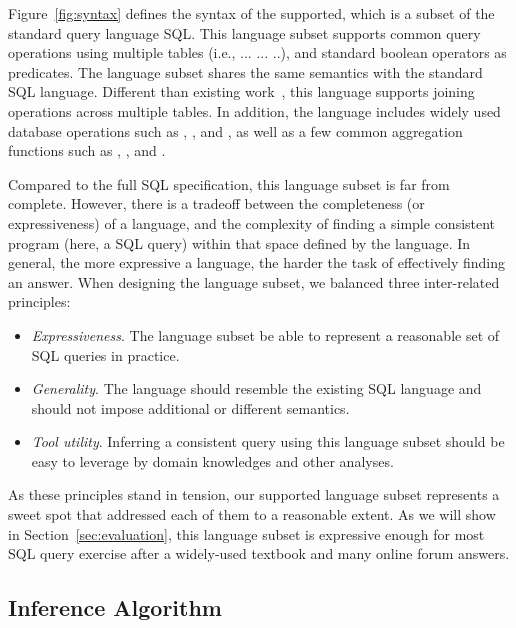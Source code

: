 Figure~\ref{fig:syntax} defines the syntax of the supported, which
is a subset of the standard query language SQL. This language subset
supports common query operations using multiple tables (i.e.,
 ... ... ..), and standard
boolean operators as predicates. The language
subset shares the same semantics with the standard SQL language.
Different than existing work~\cite{DasSarma:2010}, this language supports
joining operations across multiple tables.  In addition, the language includes
widely used database operations such as ,
, and , as
well as a few common aggregation functions such as ,
, and .

Compared to the full SQL specification, this language subset is far from complete.
However, there is a tradeoff between the completeness (or expressiveness) of a language,
and the complexity of finding a simple consistent program (here, a SQL query)
within that space defined by the language. In general, the more expressive
a language, the harder the task of effectively finding an answer. When
designing the language subset, we balanced three inter-related principles:

\begin{itemize}

\item \textit{Expressiveness}. The language subset be able
to represent a reasonable set of SQL queries in practice.

\item \textit{Generality}. The language should resemble
the existing SQL language and should not impose additional
or different semantics.

\item \textit{Tool utility}. Inferring a consistent query
using this language subset should be easy to leverage by
domain knowledges and other analyses.

\end{itemize}

As these principles stand in tension, our supported language subset
represents a sweet spot that addressed each of them to a reasonable
extent. As we will show in Section~\ref{sec:evaluation}, this
language subset is expressive enough for most SQL query exercise
after a widely-used textbook and many online forum answers.


\subsection{Inference Algorithm}

